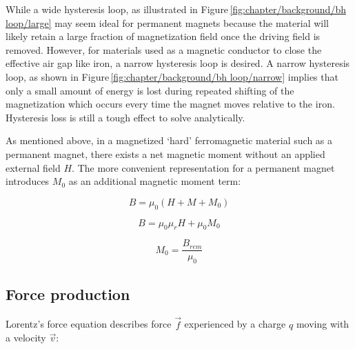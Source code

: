         
        While a wide hysteresis loop, as illustrated in Figure\,\ref{fig:chapter/background/bh loop/large} may seem ideal for permanent magnets because the material will likely retain a large fraction of magnetization field once the driving field is removed. However, for materials used as a magnetic conductor to close the effective air gap like iron, a narrow hysteresis loop is desired. A narrow hysteresis loop, as shown in Figure\,\ref{fig:chapter/background/bh loop/narrow} implies that only a small amount of energy is lost during repeated shifting of the magnetization which occurs every time the magnet moves relative to the iron. Hysteresis loss is still a tough effect to solve analytically.
        
        
        As mentioned above, in a magnetized ‘hard’ ferromagnetic material such as a permanent magnet, there exists a net magnetic moment without an applied external field $H$. The more convenient representation for a permanent magnet introduces $M_0$ as an additional magnetic moment term:


        \begin{equation}
            B = \mu_0 (H + M + M_0)
            \label{eq:B field equation 1}
        \end{equation}   
        
        \begin{equation}
            B = \mu_0 \mu_r H + \mu_0 M_0
            \label{eq:B field equation 2}
        \end{equation}   
        
        \begin{equation}
            M_0 = \frac{B_{rem}}{\mu_0}
            \label{eq:B rem equation}
        \end{equation}  
        
    
    \subsection{Force production}                   \label{Chapter:background/electromagnetic field theory/force production}
    
        Lorentz's force equation describes force $\overrightarrow{f}$ experienced by a charge $q$ moving with a velocity $\overrightarrow{v}$:
        
